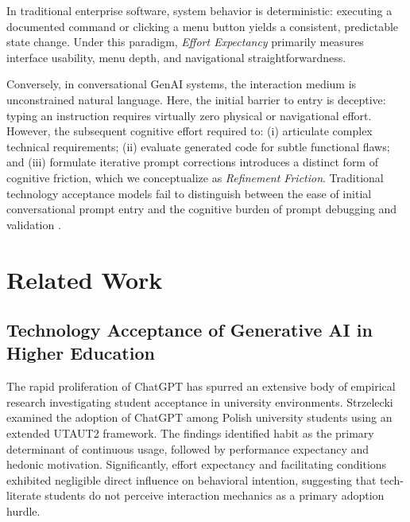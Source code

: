 \documentclass{cleiej}
\begin{document}
In traditional enterprise software, system behavior is deterministic: executing a documented command or clicking a menu button yields a consistent, predictable state change. Under this paradigm, \textit{Effort Expectancy} primarily measures interface usability, menu depth, and navigational straightforwardness. 

Conversely, in conversational GenAI systems, the interaction medium is unconstrained natural language. Here, the initial barrier to entry is deceptive: typing an instruction requires virtually zero physical or navigational effort. However, the subsequent cognitive effort required to: (i) articulate complex technical requirements; (ii) evaluate generated code for subtle functional flaws; and (iii) formulate iterative prompt corrections introduces a distinct form of cognitive friction, which we conceptualize as \textit{Refinement Friction}. Traditional technology acceptance models fail to distinguish between the ease of initial conversational prompt entry and the cognitive burden of prompt debugging and validation \cite{zamfirescu2023prompt}.

\section{Related Work}
\label{sec:related}

\subsection{Technology Acceptance of Generative AI in Higher Education}
The rapid proliferation of ChatGPT has spurred an extensive body of empirical research investigating student acceptance in university environments. Strzelecki \cite{strzelecki2024students} examined the adoption of ChatGPT among Polish university students using an extended UTAUT2 framework. The findings identified habit as the primary determinant of continuous usage, followed by performance expectancy and hedonic motivation. Significantly, effort expectancy and facilitating conditions exhibited negligible direct influence on behavioral intention, suggesting that tech-literate students do not perceive interaction mechanics as a primary adoption hurdle.
\end{document}
